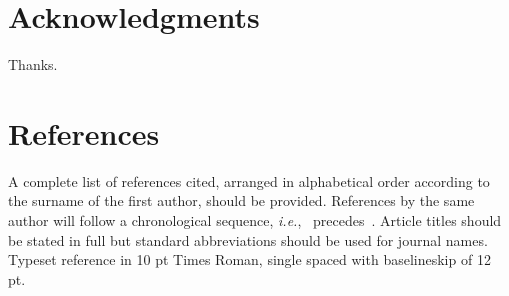 \documentclass{ws-jai}
\begin{document}
\section*{Acknowledgments}
Thanks.

\section*{References}
\noindent A complete list of references cited, arranged in
alphabetical order according to the surname of the first author,
should be provided. References by the same author will follow a
chronological sequence, \textit{i.e.},~\cite{Lie00} precedes~\cite{Lie01}.
Article titles should be stated in full but standard abbreviations
should be used for journal names. Typeset reference in 10 pt Times
Roman, single spaced with baselineskip of 12 pt.


\end{document}
